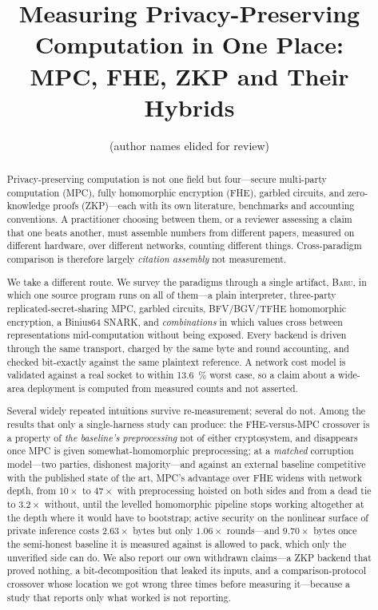 \documentclass[11pt]{article}
\title{\bfseries Measuring Privacy-Preserving Computation in One Place:\\
MPC, FHE, ZKP and Their Hybrids}
\author{(author names elided for review)}
\date{}
\newcommand{\Baru}{\textsc{Baru}}
\begin{document}
\maketitle

\begin{abstract}
Privacy-preserving computation is not one field but four---secure multi-party
computation (MPC), fully homomorphic encryption (FHE), garbled circuits, and
zero-knowledge proofs (ZKP)---each with its own literature, benchmarks and
accounting conventions. A practitioner choosing between them, or a reviewer
assessing a claim that one beats another, must assemble numbers from different
papers, measured on different hardware, over different networks, counting
different things. Cross-paradigm comparison is therefore largely \emph{citation
assembly} not measurement.

We take a different route. We survey the paradigms through a single artifact,
\Baru{}, in which one source program runs on all of them---a plain interpreter,
three-party replicated-secret-sharing MPC, garbled circuits, BFV/BGV/TFHE
homomorphic encryption, a Binius64 SNARK, and \emph{combinations} in which
values cross between representations mid-computation without being exposed.
Every backend is driven through the same transport, charged by the same byte and
round accounting, and checked bit-exactly against the same plaintext reference.
A network cost model is validated against a real socket to within \SI{13.6}{\percent}
worst case, so a claim about a wide-area deployment is computed from measured
counts and not asserted.

Several widely repeated intuitions survive re-measurement; several do not. Among
the results that only a single-harness study can produce: the FHE-versus-MPC
crossover is a property of \emph{the baseline's preprocessing} not of
either cryptosystem, and disappears once MPC is given somewhat-homomorphic
preprocessing; at a \emph{matched} corruption model---two parties, dishonest
majority---and against an external baseline competitive with the published state of
the art, MPC's advantage over FHE widens with network depth, from $10\times$ to
$47\times$ with preprocessing hoisted on both sides and from a dead tie to
$3.2\times$ without, until the levelled homomorphic pipeline stops working
altogether at the depth where it would have to bootstrap; active security on the nonlinear surface of private inference
costs $2.63\times$ bytes but only $1.06\times$ rounds---and $9.70\times$ bytes once
the semi-honest baseline it is measured against is allowed to pack, which only the
unverified side can do. We also report our own
withdrawn claims---a ZKP backend that proved nothing, a bit-decomposition that
leaked its inputs, and a comparison-protocol crossover whose location we got wrong
three times before measuring it---because a study that reports only what worked is
not
reporting.
\end{abstract}
\end{document}
